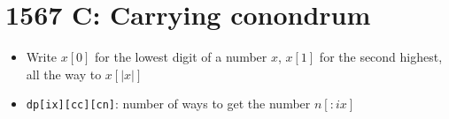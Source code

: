\section{1567 C: Carrying conondrum}
\begin{itemize}
\item Write $x[0]$ for the lowest digit of a number $x$, $x[1]$ for the second highest, all the way to $x[|x|]$
\item \texttt{dp[ix][cc][cn]}: number of ways to get the number $n[:ix]$
\end{itemize}

\newpage
